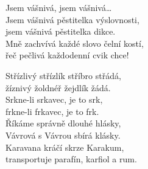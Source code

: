 
\nv Jsem vášnivá, jsem vášnivá\dots\\
Jsem vášnivá pěstitelka výslovnosti,\\
jsem vášnivá pěstitelka dikce.\\
Mně zachvívá každé slovo čelní kostí,\\
řeč pečlivá každodenní cvik chce!


\nv {}Střízlivý střízlík stříbro střádá,\\
žíznivý žoldnéř žejdlík žádá.\\
Srkne-li srkavec, je to srk,\\
frkne-li frkavec, je to frk.\\
Říkáme správně dlouhé hlásky,\\
Vávrová s Vávrou sbírá klásky.\\
Karavana kráčí skrze Karakum,\\
transportuje parafín, karfiol a rum.
\newpage
